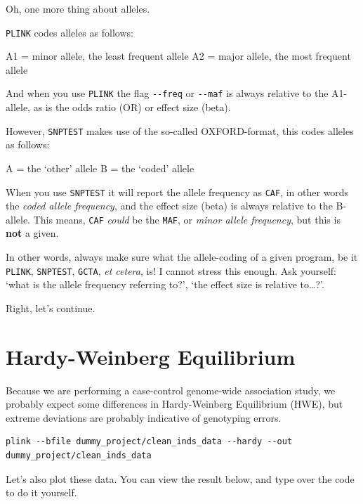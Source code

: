 \documentclass[
]{book}
\newcommand{\passthrough}[1]{#1}
\begin{document}
Oh, one more thing about alleles.

\passthrough{\lstinline!PLINK!} codes alleles as follows:

A1 = minor allele, the least frequent allele
A2 = major allele, the most frequent allele

And when you use \passthrough{\lstinline!PLINK!} the flag \passthrough{\lstinline!--freq!} or \passthrough{\lstinline!--maf!} is always relative to the A1-allele, as is the odds ratio (OR) or effect size (beta).

However, \passthrough{\lstinline!SNPTEST!} makes use of the so-called OXFORD-format, this codes alleles as follows:

A = the `other' allele
B = the `coded' allele

When you use \passthrough{\lstinline!SNPTEST!} it will report the allele frequency as \passthrough{\lstinline!CAF!}, in other words the \emph{coded allele frequency}, and the effect size (beta) is always relative to the B-allele. This means, \passthrough{\lstinline!CAF!} \emph{could} be the \passthrough{\lstinline!MAF!}, or \emph{minor allele frequency}, but this is \textbf{not} a given.

In other words, always make sure what the allele-coding of a given program, be it \passthrough{\lstinline!PLINK!}, \passthrough{\lstinline!SNPTEST!}, \passthrough{\lstinline!GCTA!}, \emph{et cetera}, is! I cannot stress this enough. Ask yourself: `what is the allele frequency referring to?', `the effect size is relative to\ldots?'.

Right, let's continue.

\hypertarget{hardy-weinberg-equilibrium}{%
\section{Hardy-Weinberg Equilibrium}\label{hardy-weinberg-equilibrium}}

Because we are performing a case-control genome-wide association study, we probably expect some differences in Hardy-Weinberg Equilibrium (HWE), but extreme deviations are probably indicative of genotyping errors.

\begin{lstlisting}
plink --bfile dummy_project/clean_inds_data --hardy --out dummy_project/clean_inds_data
\end{lstlisting}

Let's also plot these data. You can view the result below, and type over the code to do it yourself.
\end{document}
